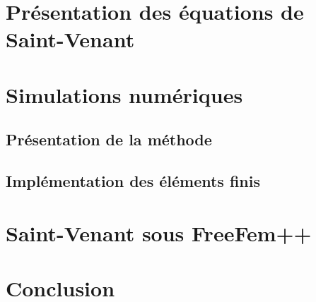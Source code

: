 \documentclass{report}
\begin{document}




\chapter{Présentation des équations de Saint-Venant}



\chapter{Simulations numériques}
\section{Présentation de la méthode}

\section{Implémentation des éléments finis}

\chapter{Saint-Venant sous FreeFem++}


\chapter*{Conclusion}


\end{document}
